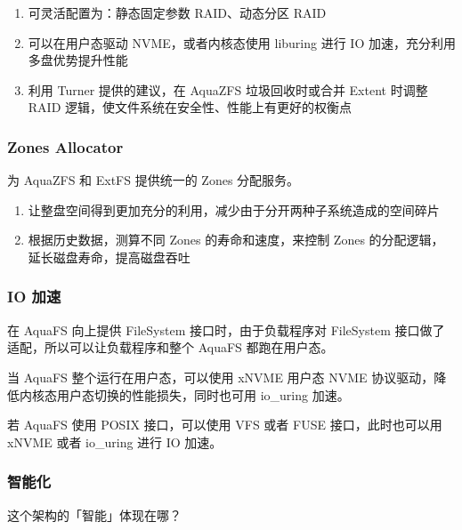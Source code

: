 \begin{enumerate}
    \item 可灵活配置为：静态固定参数 RAID、动态分区 RAID
    \item 可以在用户态驱动 NVME，或者内核态使用 liburing 进行 IO 加速，充分利用多盘优势提升性能
    \item 利用 Turner 提供的建议，在 AquaZFS 垃圾回收时或合并 Extent 时调整 RAID 逻辑，使文件系统在安全性、性能上有更好的权衡点
\end{enumerate}

\subsubsection*{Zones Allocator}

为 AquaZFS 和 ExtFS 提供统一的 Zones 分配服务。

\begin{enumerate}
    \item 让整盘空间得到更加充分的利用，减少由于分开两种子系统造成的空间碎片
    \item 根据历史数据，测算不同 Zones 的寿命和速度，来控制 Zones 的分配逻辑，延长磁盘寿命，提高磁盘吞吐
\end{enumerate}

\subsubsection*{IO 加速}

在 AquaFS 向上提供 FileSystem 接口时，由于负载程序对 FileSystem 接口做了适配，所以可以让负载程序和整个 AquaFS 都跑在用户态。

当 AquaFS 整个运行在用户态，可以使用 xNVME 用户态 NVME 协议驱动，降低内核态用户态切换的性能损失，同时也可用 io\_uring 加速。

若 AquaFS 使用 POSIX 接口，可以使用 VFS 或者 FUSE 接口，此时也可以用 xNVME 或者 io\_uring 进行 IO 加速。

\subsubsection*{智能化}

这个架构的「智能」体现在哪？


